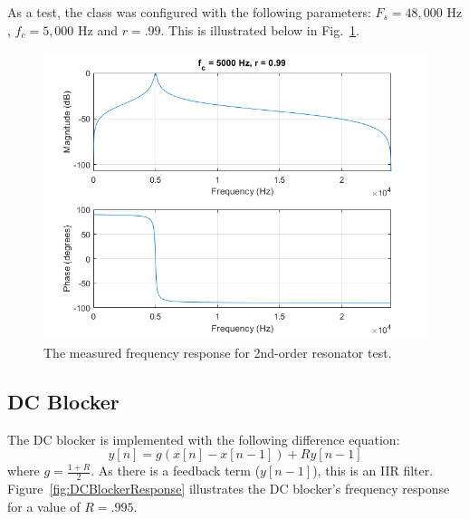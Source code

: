 \documentclass[../main.tex]{subfiles}
\begin{document}
As a test, the class was configured with the following parameters: $F_s = 48,000\text{ Hz}$, $f_c = 5,000\text{ Hz}$ and $r = .99$.
This is illustrated below in Fig.~\ref{fig:ResoTest}.

\begin{figure}[h]
    \centering
    \includegraphics[scale=.53]{./images/plots/ResonatorTest.png}
    \caption{The measured frequency response for 2nd-order resonator test.}
    \label{fig:ResoTest}
\end{figure}

\subsection{DC Blocker}
The DC blocker is implemented with the following difference equation:
\begin{equation}
    y[n] = g (x[n] - x[n-1]) + Ry[n-1]
\end{equation}
where $g = \frac{1+R}{2}$. As there is a feedback term ($y[n-1]$), this is an IIR filter. Figure~\ref{fig:DCBlockerResponse} illustrates the DC blocker's frequency response for a value of $R = .995$.
\end{document}
